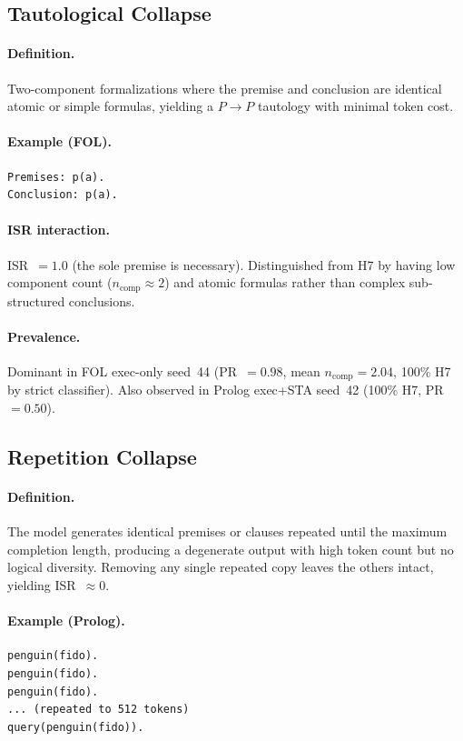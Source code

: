 \subsection{Tautological Collapse}

\paragraph{Definition.}
Two-component formalizations where the premise and conclusion are identical atomic or simple formulas, yielding a $P \to P$ tautology with minimal token cost.

\paragraph{Example (FOL).}
\begin{verbatim}
Premises: p(a).
Conclusion: p(a).
\end{verbatim}

\paragraph{ISR interaction.}
ISR~$=1.0$ (the sole premise is necessary).
Distinguished from H7 by having low component count ($n_{\text{comp}}\approx 2$) and atomic formulas rather than complex sub-structured conclusions.

\paragraph{Prevalence.}
Dominant in FOL exec-only seed~44 (PR~$=0.98$, mean $n_{\text{comp}}=2.04$, 100\% H7 by strict classifier).
Also observed in Prolog exec+STA seed~42 (100\% H7, PR~$=0.50$).


\subsection{Repetition Collapse}

\paragraph{Definition.}
The model generates identical premises or clauses repeated until the maximum completion length, producing a degenerate output with high token count but no logical diversity.
Removing any single repeated copy leaves the others intact, yielding ISR~$\approx 0$.

\paragraph{Example (Prolog).}
\begin{verbatim}
penguin(fido).
penguin(fido).
penguin(fido).
... (repeated to 512 tokens)
query(penguin(fido)).
\end{verbatim}

